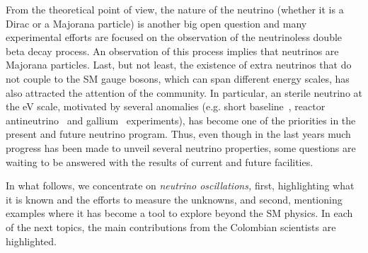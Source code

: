 \documentclass[a4paper,11pt]{article}
\begin{document}
From the theoretical point of view, the nature of the neutrino (whether it is a Dirac or a Majorana particle) is another big open question and many experimental efforts are focused on the observation of the neutrinoless double beta decay process. An observation of this process implies that neutrinos are Majorana particles. Last, but not least, the existence of extra neutrinos that do not couple to the SM gauge bosons, which can span different energy scales, has also attracted the attention of the community. In particular, an sterile neutrino at the eV scale, motivated by several anomalies (e.g. short baseline~\cite{Aguilar:2001ty, Aguilar-Arevalo:2013pmq}, reactor antineutrino~\cite{Mueller:2011nm} and gallium~\cite{Acero:2007su, Giunti:2010zu} experiments), has become one of the priorities in the present and future neutrino program. Thus, even though in the last years much progress has been made to unveil several neutrino properties, some questions are waiting to be answered with the results of current and future facilities.

In what follows, we concentrate on {\it neutrino oscillations,} first, highlighting what it is known and the efforts to measure the unknowns, and second, mentioning examples where it has become a tool to explore beyond the SM physics. In each of the next topics, the main contributions from the Colombian scientists are highlighted.
\end{document}

